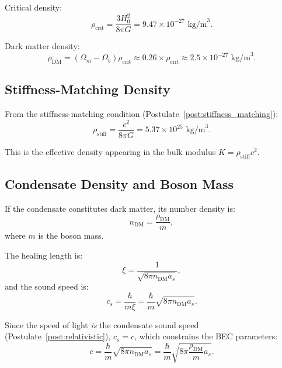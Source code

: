 \documentclass[11pt,a4paper]{article}
\newcommand{\rhocrit}{\ensuremath{\rho_{\mathrm{crit}}}}
\newcommand{\rhostiff}{\ensuremath{\rho_{\mathrm{stiff}}}}
\theoremstyle{definition}
\theoremstyle{remark}
\begin{document}
Critical density:
\begin{equation}
\rhocrit = \frac{3H_0^2}{8\pi G} = 9.47 \times 10^{-27} \text{ kg/m}^3.
\end{equation}

Dark matter density:
\begin{equation}
\rho_{\mathrm{DM}} = (\Omega_m - \Omega_b)\rhocrit \approx 0.26 \times \rhocrit \approx 2.5 \times 10^{-27} \text{ kg/m}^3.
\end{equation}

\subsection{Stiffness-Matching Density}
\label{sec:stiffness_density}

From the stiffness-matching condition (Postulate~\ref{post:stiffness_matching}):
\begin{equation}
\rhostiff = \frac{c^2}{8\pi G} = 5.37 \times 10^{25} \text{ kg/m}^3.
\end{equation}

This is the effective density appearing in the bulk modulus $K = \rhostiff c^2$.

\subsection{Condensate Density and Boson Mass}
\label{sec:condensate_density}

If the condensate constitutes dark matter, its number density is:
\begin{equation}
n_{\mathrm{DM}} = \frac{\rho_{\mathrm{DM}}}{m},
\end{equation}
where $m$ is the boson mass.

The healing length is:
\begin{equation}
\xi = \frac{1}{\sqrt{8\pi n_{\mathrm{DM}} a_s}},
\end{equation}
and the sound speed is:
\begin{equation}
c_s = \frac{\hbar}{m\xi} = \frac{\hbar}{m}\sqrt{8\pi n_{\mathrm{DM}} a_s}.
\end{equation}

Since the speed of light \emph{is} the condensate sound speed (Postulate~\ref{post:relativistic}), $c_s = c$, which constrains the BEC parameters:
\begin{equation}
\label{eq:cs_condition}
c = \frac{\hbar}{m}\sqrt{8\pi n_{\mathrm{DM}} a_s} = \frac{\hbar}{m}\sqrt{8\pi \frac{\rho_{\mathrm{DM}}}{m} a_s}.
\end{equation}
\end{document}
